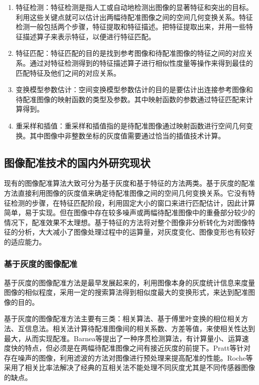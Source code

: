 \documentclass[a4paper,12pt]{article}
\begin{document}
\begin{enumerate}
\item 特征检测：特征检测是指人工或自动地检测出图像的显著特征和突出的目标。利用这些关键点就可以估计出两幅待配准图像之间的空间几何变换关系。特征检测一般包括两个步骤，特征提取和特征描述。把特征提取出来，并用一些特征描述算子来表示特征，以便进行特征匹配。
\item 特征匹配：特征匹配的目的是找到参考图像和待配准图像的特征之间的对应关系。通过对特征检测得到的特征描述算子进行相似性度量等操作来得到最佳的匹配特征及他们之间的对应关系。
\item 变换模型参数估计：空间变换模型参数估计的目的是要估计出连接参考图像和待配准图像的映射函数的类型及参数。其中映射函数的参数通过特征匹配来计算得到。
\item 重采样和插值：重采样和插值指的是待配准图像通过映射函数进行空间几何变换。其中图像中非整数坐标的灰度值需要通过恰当的插值技术计算。
\end{enumerate}
\subsection{图像配准技术的国内外研究现状}

现有的图像配准算法大致可分为基于灰度和基于特征的方法两类。基于灰度的配准方法直接利用图像的灰度值来确定待配准图像之间的空间几何变换关系。它没有特征检测的步骤，在特征匹配阶段，利用固定大小的窗口来进行匹配估计，因此计算简单，易于实现。但在图像中存在较多噪声或两幅待配准图像中的重叠部分较少的情况下，配准效果不太理想。基于特征的方法将对整个图像非分析转化为对图像特征的分析，大大减小了图像处理过程中的运算量，对灰度变化、图像变形也有较好的适应能力。

\subsubsection{基于灰度的图像配准}

基于灰度的图像配准方法是最早发展起来的，利用图像本身的灰度统计信息来度量图像的相似程度，采用一定的搜索算法得到相似度最大的变换形式，来达到配准图像的目的。

基于灰度的图像配准方法主要有三类：相关算法、基于傅里叶变换的相位相关方法、互信息法。相关法计算待配准图像间的相关系数、方差等值，来使相关性达到最大，从而实现配准。Barnea\cite{8:article}等提出了一种序贯检测算法，有计算量小、运算速度快的特点，但必须是在两幅待配准图像之间有接近灰度的前提下。Pratt\cite{9:article}等针对存在噪声的图像，利用滤波的方法对图像进行预处理来提高配准的性能。Roche\cite{10:article}等采用了相关比率法解决了经典的互相关法不能处理不同灰度尤其是不同传感器图像的缺点。
\end{document}
